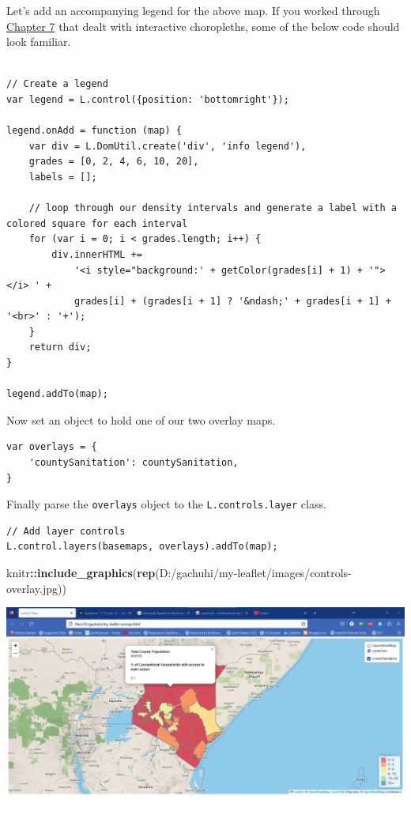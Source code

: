 \documentclass[
]{book}
\newenvironment{Shaded}{\begin{snugshade}}{\end{snugshade}}
\newcommand{\FunctionTok}[1]{\textcolor[rgb]{0.13,0.29,0.53}{\textbf{#1}}}
\newcommand{\NormalTok}[1]{#1}
\newcommand{\SpecialCharTok}[1]{\textcolor[rgb]{0.81,0.36,0.00}{\textbf{#1}}}
\newcommand{\StringTok}[1]{\textcolor[rgb]{0.31,0.60,0.02}{#1}}
\begin{document}
Let's add an accompanying legend for the above map. If you worked through \protect\hyperlink{creating-an-interactive-choropleth-map}{Chapter 7} that dealt with interactive choropleths, some of the below code should look familiar.

\begin{verbatim}

// Create a legend
var legend = L.control({position: 'bottomright'});

legend.onAdd = function (map) {
    var div = L.DomUtil.create('div', 'info legend'),
    grades = [0, 2, 4, 6, 10, 20],
    labels = [];

    // loop through our density intervals and generate a label with a colored square for each interval
    for (var i = 0; i < grades.length; i++) {
        div.innerHTML += 
            '<i style="background:' + getColor(grades[i] + 1) + '"></i> ' + 
            grades[i] + (grades[i + 1] ? '&ndash;' + grades[i + 1] + '<br>' : '+');
    }
    return div;
}

legend.addTo(map);
\end{verbatim}

Now set an object to hold one of our two overlay maps.

\begin{verbatim}
var overlays = {
    'countySanitation': countySanitation,
}
\end{verbatim}

Finally parse the \texttt{overlays} object to the \texttt{L.controls.layer} class.

\begin{verbatim}
// Add layer controls
L.control.layers(basemaps, overlays).addTo(map);
\end{verbatim}

\begin{Shaded}
\begin{Highlighting}[]
\NormalTok{knitr}\SpecialCharTok{::}\FunctionTok{include\_graphics}\NormalTok{(}\FunctionTok{rep}\NormalTok{(}\StringTok{\textquotesingle{}D:/gachuhi/my{-}leaflet/images/controls{-}overlay.jpg\textquotesingle{}}\NormalTok{))}
\end{Highlighting}
\end{Shaded}

\includegraphics{../images/controls-overlay.jpg}
\end{document}
